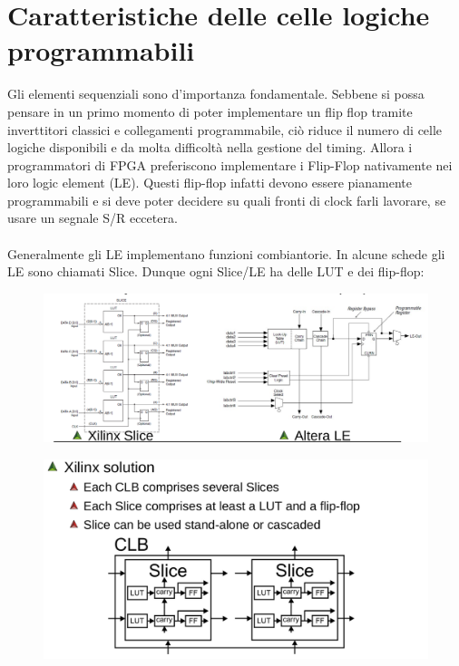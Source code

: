 \documentclass{book}
\begin{document}
\section{Caratteristiche delle celle logiche programmabili}
    Gli elementi sequenziali sono d'importanza fondamentale. Sebbene si possa pensare in un primo momento di poter implementare un flip flop tramite inverttitori classici e collegamenti programmabile, ciò riduce il numero di celle logiche disponibili e da molta difficoltà nella gestione del timing. Allora i programmatori di FPGA preferiscono implementare i Flip-Flop nativamente nei loro logic element (LE). Questi flip-flop infatti devono essere pianamente programmabili e si deve poter decidere su quali fronti di clock farli lavorare, se usare un segnale S/R eccetera.\\ \\
    Generalmente gli LE implementano funzioni combiantorie. In alcune schede gli LE sono chiamati Slice. Dunque ogni Slice/LE ha delle LUT e dei flip-flop:
    \begin{figure}[h!]
        \centering
        \includegraphics[width=0.95\linewidth]{img/chapt4img6.png}
    \end{figure}
    \begin{figure}[h!]
        \centering
        \includegraphics[width=1\linewidth]{img/chapt4img8.png}
    \end{figure}
\end{document}
